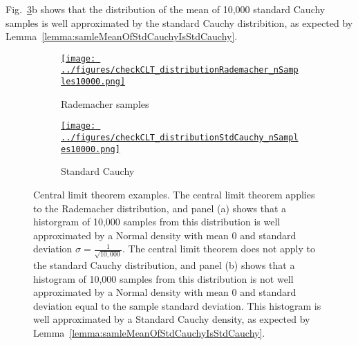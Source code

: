 \documentclass[12pt]{article}
\def\fig_width{3.5in}
\begin{document}
\begin{appendices}
Fig.~\ref{fig:cltExamples}b shows that the distribution of the mean of 10,000
standard Cauchy samples is well approximated by the standard Cauchy
distribition, as expected by Lemma~\ref{lemma:samleMeanOfStdCauchyIsStdCauchy}.

\begin{figure}[H]
    \begin{center}

        \begin{subfigure}{1.0\textwidth}
            \centering
            \href{https://www.gatsby.ucl.ac.uk/~rapela/neuroinformatics/2023/ws1/figures/checkCLT_distributionRademacher_nSamples10000.html}{\texttt{[image: ../figures/checkCLT\_distributionRademacher\_nSamples10000.png]}}

            \caption{Rademacher samples}

            \label{fig:cltExamples_1}
        \end{subfigure}

        \begin{subfigure}{1.0\textwidth}
            \centering
            \href{https://www.gatsby.ucl.ac.uk/~rapela/neuroinformatics/2023/ws1/figures/checkCLT_distributionStdCauchy_nSamples10000.html}{\texttt{[image: ../figures/checkCLT\_distributionStdCauchy\_nSamples10000.png]}}

            \caption{Standard Cauchy}

            \label{fig:cltExamples_2}
        \end{subfigure}

        \caption{Central limit theorem examples. The central limit theorem
        applies to the Rademacher distribution, and panel (a) shows that a
        historgram of 10,000 samples from this distribution is well
        approximated by a Normal density with mean 0 and standard deviation
        $\sigma=\frac{1}{\sqrt{10,000}}$. The central limit theorem does not
        apply to the standard Cauchy distribution, and panel (b) shows that a
        histogram of 10,000 samples from this distribution is not well
        approximated by a Normal density with mean 0 and standard deviation
        equal to the sample standard deviation. This histogram is well
        approximated by a Standard Cauchy density, as expected by
        Lemma~\ref{lemma:samleMeanOfStdCauchyIsStdCauchy}.}

        \label{fig:cltExamples}

    \end{center}


\end{figure}
\end{appendices}
\end{document}
